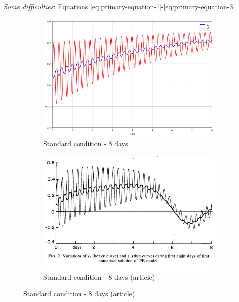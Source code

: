 \begin{frame}{\textit{Some difficulties}: Equations \eqref{eq:primary-equation-1}-\eqref{eq:primary-equation-3}}
	\begin{figure}
		\centering
		\begin{subfigure}[b]{0.45\textwidth}
			\centering
			\includegraphics[width=\textwidth]{img/p01d08.png}
			\caption{Standard condition - 8 days}
			\label{fig:p01d08}
		\end{subfigure}
		\hfill
		\begin{subfigure}[b]{0.45\textwidth}
			\centering
			\includegraphics[width=\textwidth]{img/p01d08rel.png}
			\caption{Standard condition - 8 days (article)}
			\label{fig:p01d08rel}
		\end{subfigure}
	\end{figure}
\end{frame}
